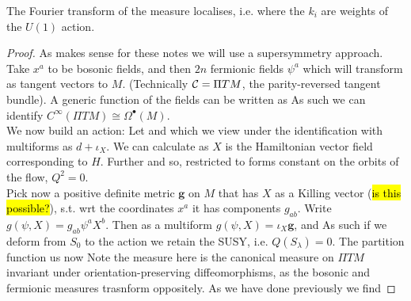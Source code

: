 \documentclass{article}
\begin{document}
\begin{theorem}
The Fourier transform of the measure localises, i.e. 
where the $k_i$ are weights of the $U(1)$ action. 
\end{theorem}
\begin{proof}
As makes sense for these notes we will use a supersymmetry approach. Take $x^a$ to be bosonic fields, and then $2n$ fermionic fields $\psi^a$ which will transform as tangent vectors to $M$. (Technically $\mathcal{C} = \Pi TM$, the parity-reversed tangent bundle). A generic function of the fields can be written as 
As such we can identify $C^\infty(\Pi TM) \cong \Omega^{\bullet}(M)$. \\
We now build an action: Let 
and 
which we view under the identification with multiforms as $d + \iota_X$. We can calculate 
as $X$ is the Hamiltonian vector field corresponding to $H$. Further 
and so, restricted to forms constant on the orbits of the flow, $Q^2 = 0$. \\
Pick now a positive definite metric $\bm{g}$ on $M$ that has $X$ as a Killing vector (\hl{is this possible?}), s.t. wrt the coordinates $x^a$ it has components $g_{ab}$. Write $g(\psi,X) = g_{ab}\psi^a X^b$. Then as a multiform $g(\psi,X)=\iota_X \bm{g}$, and 
As such if we deform from $S_0$ to the action
we retain the SUSY, i.e. $Q(S_\lambda) = 0$. The partition function us now 
Note the measure here is the canonical measure on $\Pi TM$ invariant under orientation-preserving diffeomorphisms, as the bosonic and fermionic measures trasnform oppositely. As we have done previously we find 
\end{proof}
\end{document}
